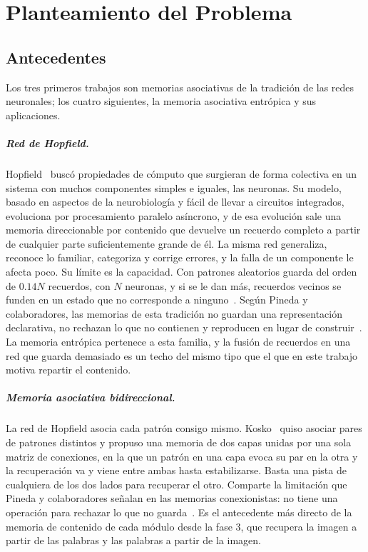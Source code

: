 \chapter{Planteamiento del Problema}\label{cap:pp}

\section{Antecedentes}

Los tres primeros trabajos son memorias asociativas de la tradición de las redes
neuronales; los cuatro siguientes, la memoria asociativa entrópica y sus aplicaciones.

\paragraph{Red de Hopfield.}
Hopfield~\cite{hopfield1982neural} buscó propiedades de cómputo que surgieran de forma
colectiva en un sistema con muchos componentes simples e iguales, las neuronas.
Su modelo, basado en aspectos de la neurobiología y fácil de llevar a circuitos integrados,
evoluciona por procesamiento paralelo asíncrono, y de esa evolución sale una memoria
direccionable por contenido que devuelve un recuerdo completo a partir de cualquier parte
suficientemente grande de él.
La misma red generaliza, reconoce lo familiar, categoriza y corrige errores, y la falla
de un componente le afecta poco.
Su límite es la capacidad.
Con patrones aleatorios guarda del orden de $0.14N$ recuerdos, con $N$ neuronas, y si se
le dan más, recuerdos vecinos se funden en un estado que no corresponde a
ninguno~\cite{krotov2016dense}.
Según Pineda y colaboradores, las memorias de esta tradición no guardan una
representación declarativa, no rechazan lo que no contienen y reproducen en lugar de
construir~\cite{pineda2021entropic}.
La memoria entrópica pertenece a esta familia, y la fusión de recuerdos en una red que
guarda demasiado es un techo del mismo tipo que el que en este trabajo motiva repartir el
contenido.

\paragraph{Memoria asociativa bidireccional.}
La red de Hopfield asocia cada patrón consigo mismo.
Kosko~\cite{kosko1988bidirectional} quiso asociar pares de patrones distintos y propuso
una memoria de dos capas unidas por una sola matriz de conexiones, en la que un patrón en
una capa evoca su par en la otra y la recuperación va y viene entre ambas hasta
estabilizarse.
Basta una pista de cualquiera de los dos lados para recuperar el otro.
Comparte la limitación que Pineda y colaboradores señalan en las memorias conexionistas:
no tiene una operación para rechazar lo que no guarda~\cite{pineda2021entropic}.
Es el antecedente más directo de la memoria de contenido de cada módulo desde la fase 3,
que recupera la imagen a partir de las palabras y las palabras a partir de la imagen.


